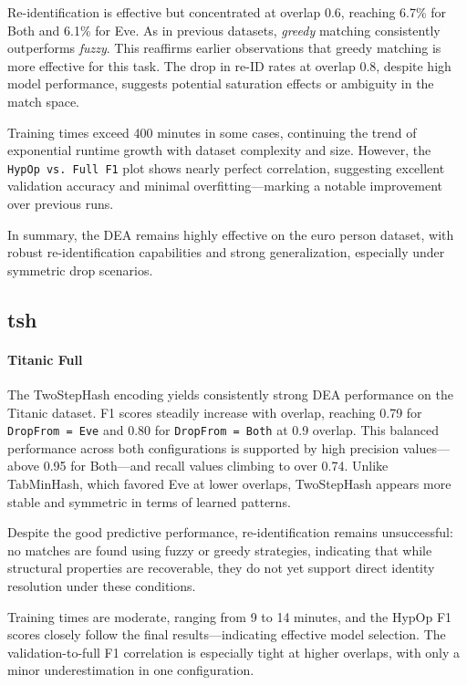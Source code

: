 Re-identification is effective but concentrated at overlap 0.6, reaching 6.7\% for Both and 6.1\% for Eve.
As in previous datasets, \emph{greedy} matching consistently outperforms \emph{fuzzy}.
This reaffirms earlier observations that greedy matching is more effective for this task.
The drop in re-ID rates at overlap 0.8, despite high model performance, suggests potential saturation effects or ambiguity in the match space.

Training times exceed 400 minutes in some cases, continuing the trend of exponential runtime growth with dataset complexity and size.
However, the \texttt{HypOp vs. Full F1} plot shows nearly perfect correlation, suggesting excellent validation accuracy and minimal overfitting—marking a notable improvement over previous runs.

In summary, the DEA remains highly effective on the euro person dataset, with robust re-identification capabilities and strong generalization, especially under symmetric drop scenarios.


\subsection{\ac{tsh}}

\paragraph{Titanic Full}

The TwoStepHash encoding yields consistently strong DEA performance on the Titanic dataset.
F1 scores steadily increase with overlap, reaching 0.79 for \texttt{DropFrom = Eve} and 0.80 for \texttt{DropFrom = Both} at 0.9 overlap.
This balanced performance across both configurations is supported by high precision values—above 0.95 for Both—and recall values climbing to over 0.74.
Unlike TabMinHash, which favored Eve at lower overlaps, TwoStepHash appears more stable and symmetric in terms of learned patterns.

Despite the good predictive performance, re-identification remains unsuccessful: no matches are found using fuzzy or greedy strategies, indicating that while structural properties are recoverable, they do not yet support direct identity resolution under these conditions.

Training times are moderate, ranging from 9 to 14 minutes, and the HypOp F1 scores closely follow the final results—indicating effective model selection.
The validation-to-full F1 correlation is especially tight at higher overlaps, with only a minor underestimation in one configuration.

